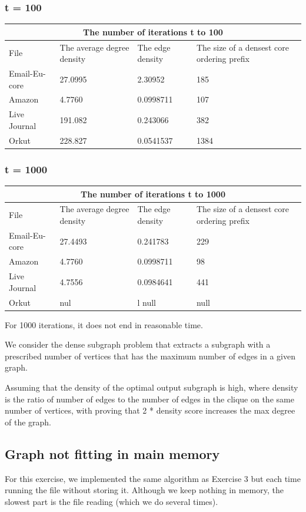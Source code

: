 \documentclass{article}
\begin{document}
\subsubsection{t = 100}
\begin{tabular}{ |p{3.0cm}||p{3.0cm}|p{3.0cm}|p{3.0cm}| }
 \hline
 \multicolumn{4}{|c|}{ The number of iterations t to 100 } \\
 \hline
 File & The average degree density & The edge density & The size of a densest core ordering prefix\\
 \hline
 Email-Eu-core & 27.0995 & 2.30952 & 185\\
 Amazon & 4.7760 & 0.0998711 & 107 \\
 Live Journal & 191.082 & 0.243066 & 382\\
 Orkut & 228.827 & 0.0541537 & 1384\\
 \hline
\end{tabular}

\subsubsection{t = 1000}
\begin{tabular}{ |p{3.0cm}||p{3.0cm}|p{3.0cm}|p{3.0cm}| }
 \hline
 \multicolumn{4}{|c|}{ The number of iterations t to 1000 } \\
 \hline
 File & The average degree density & The edge density & The size of a densest core ordering prefix\\
 \hline
 Email-Eu-core & 27.4493 & 0.241783 & 229\\
 Amazon & 4.7760 & 0.0998711 & 98 \\
 Live Journal & 4.7556 & 0.0984641 & 441\\
 Orkut & nul &l null & null\\
 \hline
\end{tabular}

For 1000 iterations, it does not end in reasonable time.
    

We consider the dense subgraph problem that extracts a subgraph with a prescribed number of vertices that has the maximum number of edges in a given graph. 

Assuming that the density of the optimal output subgraph is high, where density is the ratio of number of edges to the number of edges in the clique on the same number of vertices, with proving that 2 * density score increases the max degree of the graph.


\subsection{Graph not fitting in main memory}
For this exercise, we implemented the same algorithm as Exercise 3 but each time running the file without storing it.
Although we keep nothing in memory, the slowest part is the file reading (which we do several times).
\end{document}
